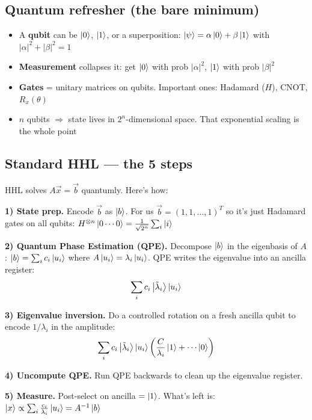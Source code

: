 \documentclass[11pt, a4paper]{article}
\begin{document}
\subsection{Quantum refresher (the bare minimum)}

\begin{itemize}
  \item A \textbf{qubit} can be $\ket{0}$, $\ket{1}$, or a superposition:
        $\ket{\psi} = \alpha\ket{0} + \beta\ket{1}$ with
        $|\alpha|^2 + |\beta|^2 = 1$
  \item \textbf{Measurement} collapses it: get $\ket{0}$ with prob
        $|\alpha|^2$, $\ket{1}$ with prob $|\beta|^2$
  \item \textbf{Gates} = unitary matrices on qubits. Important ones:
        Hadamard ($H$), CNOT, $R_x(\theta)$
  \item $n$ qubits $\Rightarrow$ state lives in $2^n$-dimensional space.
        That exponential scaling is the whole point
\end{itemize}

\subsection{Standard HHL --- the 5 steps}

HHL solves $A\vec{x} = \vec{b}$ quantumly. Here's how:

\medskip
\textbf{1) State prep.} Encode $\vec{b}$ as $\ket{b}$. For us $\vec{b} =
(1,1,\ldots,1)^T$ so it's just Hadamard gates on all qubits:
$H^{\otimes n}\ket{0\cdots0} = \frac{1}{\sqrt{2^n}}\sum_i \ket{i}$

\medskip
\textbf{2) Quantum Phase Estimation (QPE).} Decompose $\ket{b}$ in the
eigenbasis of $A$: $\ket{b} = \sum_i c_i \ket{u_i}$ where
$A\ket{u_i} = \lambda_i\ket{u_i}$. QPE writes the eigenvalue into an
ancilla register:
\[
  \sum_i c_i \ket{\tilde\lambda_i}\ket{u_i}
\]

\medskip
\textbf{3) Eigenvalue inversion.} Do a controlled rotation on a fresh
ancilla qubit to encode $1/\lambda_i$ in the amplitude:
\[
  \sum_i c_i \ket{\tilde\lambda_i}\ket{u_i}\left(
  \frac{C}{\lambda_i}\ket{1} + \cdots\ket{0}\right)
\]

\medskip
\textbf{4) Uncompute QPE.} Run QPE backwards to clean up the eigenvalue
register.

\medskip
\textbf{5) Measure.} Post-select on ancilla $= \ket{1}$. What's left is:
$\ket{x} \propto \sum_i \frac{c_i}{\lambda_i}\ket{u_i} = A^{-1}\ket{b}$
\end{document}
